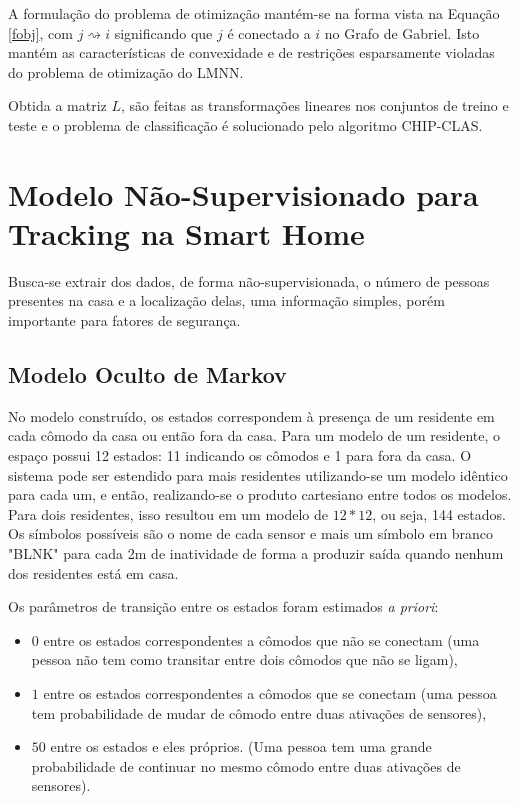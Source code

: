 \documentclass[
	12pt,				%
	openright,			%
	twoside,			%
	a4paper,			%
	english,			%
	spanish,			%
	brazil,				%
	]{abntex2}\usepackage[]{graphicx}\usepackage[]{color}
\begin{document}
A formulação do problema de otimização mantém-se na forma vista na Equação \ref{fobj}, com $j \rightsquigarrow i$ significando que $j$ é conectado a $i$ no Grafo de Gabriel. Isto mantém as características de convexidade e de restrições esparsamente violadas do problema de otimização do LMNN.
\par Obtida a matriz $L$, são feitas as transformações lineares nos conjuntos de treino e teste e o problema de classificação é solucionado pelo algoritmo CHIP-CLAS.


\section{Modelo Não-Supervisionado para Tracking na Smart Home}

Busca-se extrair dos dados, de forma não-supervisionada, o número de pessoas presentes na casa e a localização delas, uma informação simples, porém importante para fatores de segurança.


\subsection{Modelo Oculto de Markov}

No modelo construído, os estados correspondem à presença de um residente em cada cômodo da casa ou então fora da casa. Para um modelo de um residente, o espaço possui 12 estados: 11 indicando os cômodos e 1 para fora da casa. O sistema pode ser estendido para mais residentes utilizando-se um modelo idêntico para cada um, e então, realizando-se o produto cartesiano entre todos os modelos. Para dois residentes, isso resultou em um modelo de $12*12$, ou seja, 144 estados. Os símbolos possíveis são o nome de cada sensor e mais um símbolo em branco "BLNK" para cada 2m de inatividade de forma a produzir saída quando nenhum dos residentes está em casa.

Os parâmetros de transição entre os estados foram estimados \textit{a priori}:

\begin{itemize}
	\item $0$ entre os estados correspondentes a cômodos que não se conectam (uma pessoa não tem como transitar entre dois cômodos que não se ligam),
	\item $1$ entre os estados correspondentes a cômodos que se conectam (uma pessoa tem probabilidade de mudar de cômodo entre duas ativações de sensores),
	\item $50$ entre os estados e eles próprios. (Uma pessoa tem uma grande probabilidade de continuar no mesmo cômodo entre duas ativações de sensores).
\end{itemize}
\end{document}
